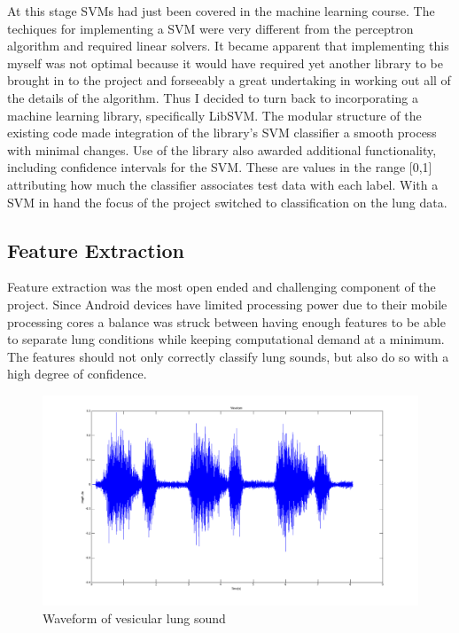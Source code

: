 \documentclass{article}
\begin{document}
 At this stage SVMs had just been covered in the machine learning course. The techiques for implementing a SVM were very different from the perceptron algorithm and required linear solvers. It became apparent that implementing this myself was not optimal because it would have required yet another library to be brought in to the project and forseeably a great undertaking in working out all of the details of the algorithm. Thus I decided to turn back to incorporating a machine learning library, specifically LibSVM. The modular structure of the existing code made integration of the library's SVM classifier a smooth process with minimal changes. Use of the library also awarded additional functionality, including confidence intervals for the SVM. These are values in the range [0,1] attributing how much the classifier associates test data with each label. With a SVM in hand the focus of the project switched to classification on the lung data. \cite{SVM}\\

\subsection{Feature Extraction}

Feature extraction was the most open ended and challenging  component of the project. Since Android devices have limited processing power due to their mobile processing cores a balance was struck between having enough features to be able to separate lung conditions while keeping computational demand at a minimum. The features should not only correctly classify lung sounds, but also do so with a high degree of confidence. \\

\begin{figure}[h!]
	\includegraphics[width=\linewidth]{images/VesicularWaveform.png}
	\caption{Waveform of vesicular lung sound}
 	\label{fig:VesicularWaveform}
\end{figure}
\end{document}

